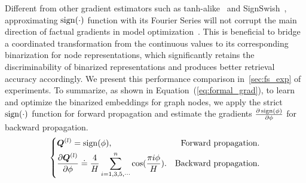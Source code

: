 Different from other gradient estimators such as tanh-alike~\cite{gong2019differentiable,qin2020forward} and SignSwish~\cite{darabi2018bnn}, approximating $\operatorname{sign}(\cdot)$ function with its Fourier Series will not corrupt the main direction of factual gradients in model optimization~\cite{xu2021learning}.
This is beneficial to bridge a coordinated transformation from the continuous values to its corresponding binarization for node representations, which significantly retains the discriminability of binarized representations and produces better retrieval accuracy accordingly.
We present this performance comparison in~\cref{sec:fs_exp} of experiments. 
To summarize, as shown in Equation~(\ref{eq:formal_grad}), to learn and optimize the binarized embeddings for graph nodes, we apply the strict $\operatorname{sign}(\cdot)$ function for forward propagation and estimate the gradients $\frac{\partial\operatorname{sign}(\phi)}{\partial \phi}$ for backward propagation.
\begin{equation}
\setlength\abovedisplayskip{2pt}
\setlength\belowdisplayskip{2pt}
\label{eq:formal_grad}
\left\{ 
\begin{aligned}
& \boldsymbol{Q}^{(l)} = \sign(\phi),  &\text{Forward propagation.} \\
& \frac{\partial \boldsymbol{Q}^{(l)}}{\partial \phi} \doteq \frac{4}{H} \sum_{i=1,3,5,\cdots}^{n} \cos(\frac{\pi i\phi}{H}). & \text{Backward propagation.}
\end{aligned}
\right.
\end{equation}